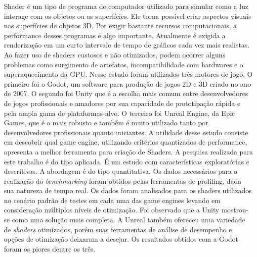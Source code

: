 Shader é um tipo de programa de computador utilizado para simular como a luz
interage com os objetos ou as superfícies. Ele torna possível criar aspectos visuais nas superfícies de objetos 3D. Por exigir bastante recursos computacionais, a performance desses programas é algo importante. Atualmente é exigida a renderização em um curto intervalo de tempo de gráficos cada vez mais realistas. Ao fazer uso de shaders custosos e não otimizados, podem ocorrer alguns problemas como surgimento de artefatos, incompatibilidade com hardwares e o superaquecimento da GPU. Nesse estudo foram utilizados três motores de jogo. O primeiro foi o Godot, um software para produção de jogos 2D e 3D criado no ano de 2007. O segundo foi Unity que é a escolha mais comum entre desenvolvedores de jogos profissionais e amadores por sua capacidade de prototipação rápida e pela ampla gama de plataformas-alvo. O terceiro foi Unreal Engine, da Epic Games, que é o mais robusto e também é muito utilizado tanto por desenvolvedores profissionais quanto iniciantes. A utilidade desse estudo consiste em descobrir qual game engine, utilizando critérios quantizados de performance, apresenta a melhor ferramenta para criação de Shaders. A pesquisa realizada para este trabalho é do tipo aplicada. É um estudo com características exploratórias e descritivas. A abordagem é do tipo quantitativa. Os dados necessários para a realização do \textit{benchmarking} foram obtidos pelas ferramentas de profiling, dada sua natureza de tempo real. Os dados foram analisados para os shaders utilizados no cenário padrão de testes em cada uma das game engines levando em consideração múltiplos níveis de otimização. Foi observado que a Unity mostrou-se como uma solução mais completa. A Unreal também ofereceu uma variedade de \textit{shaders} otimizados, porém suas ferramentas de análise de desempenho e opções de otimização deixaram a desejar. Os resultados obtidos com a Godot foram os piores dentre os três.

